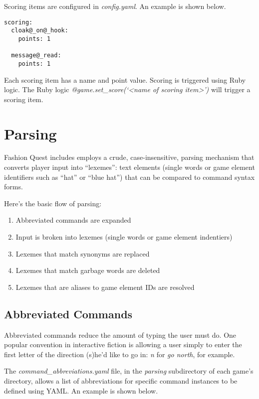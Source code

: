 \documentclass[letterpaper,10pt,english]{sphinxmanual}
\begin{document}
Scoring items are configured in \emph{config.yaml}. An example is shown below.

\begin{Verbatim}[commandchars=@\[\]]
scoring:
  cloak@_on@_hook:
    points: 1

  message@_read:
    points: 1
\end{Verbatim}

Each scoring item has a name and point value. Scoring is triggered using Ruby logic. The Ruby logic \emph{@game.set\_score(`\textless{}name of scoring item\textgreater{}')} will trigger a scoring item.


\section{Parsing}
\label{fine_tuning:parsing}
Fashion Quest includes employs a crude, case-insensitive, parsing mechanism that converts player input into ``lexemes'': text elements (single words or game element identifiers such as ``hat'' or ``blue hat'') that can be compared to command syntax forms.

Here's the basic flow of parsing:
\begin{enumerate}
\item {} 
Abbreviated commands are expanded

\item {} 
Input is broken into lexemes (single words or game element indentiers)

\item {} 
Lexemes that match synonyms are replaced

\item {} 
Lexemes that match garbage words are deleted

\item {} 
Lexemes that are aliases to game element IDs are resolved

\end{enumerate}


\subsection{Abbreviated Commands}
\label{fine_tuning:abbreviated-commands}
Abbreviated commands reduce the amount of typing the user must do. One popular convention in interactive fiction is allowing a user simply to enter the first letter of the direction (s)he'd like to go in: \emph{n} for \emph{go north}, for example.

The \emph{command\_abbreviations.yaml} file, in the \emph{parsing} subdirectory of each game's directory, allows a list of abbreviations for specific command instances to be defined using YAML. An example is shown below.
\end{document}
